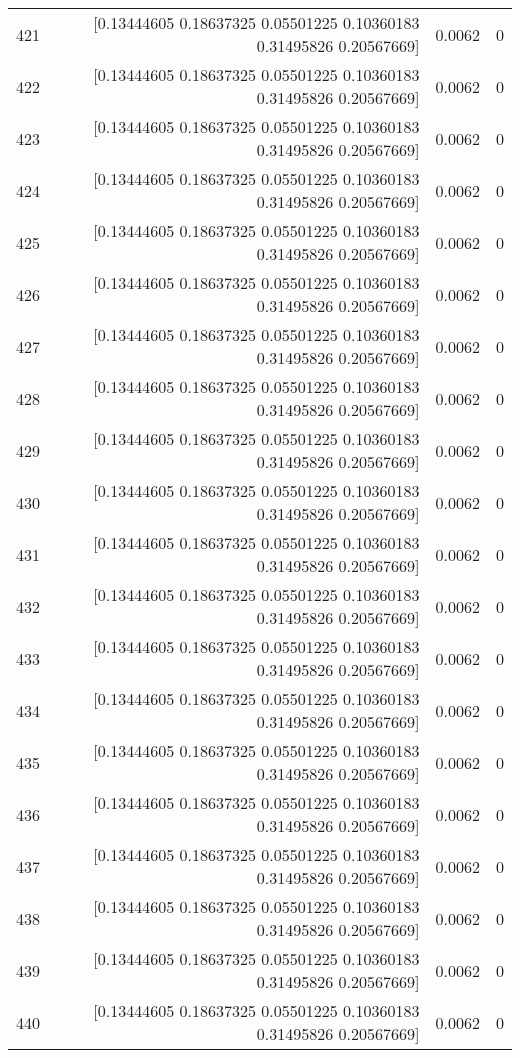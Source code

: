\begin{longtable}{lrrr}
421 & [0.13444605 0.18637325 0.05501225 0.10360183 0.31495826 0.20567669] & 0.0062 & 0 \\
422 & [0.13444605 0.18637325 0.05501225 0.10360183 0.31495826 0.20567669] & 0.0062 & 0 \\
423 & [0.13444605 0.18637325 0.05501225 0.10360183 0.31495826 0.20567669] & 0.0062 & 0 \\
424 & [0.13444605 0.18637325 0.05501225 0.10360183 0.31495826 0.20567669] & 0.0062 & 0 \\
425 & [0.13444605 0.18637325 0.05501225 0.10360183 0.31495826 0.20567669] & 0.0062 & 0 \\
426 & [0.13444605 0.18637325 0.05501225 0.10360183 0.31495826 0.20567669] & 0.0062 & 0 \\
427 & [0.13444605 0.18637325 0.05501225 0.10360183 0.31495826 0.20567669] & 0.0062 & 0 \\
428 & [0.13444605 0.18637325 0.05501225 0.10360183 0.31495826 0.20567669] & 0.0062 & 0 \\
429 & [0.13444605 0.18637325 0.05501225 0.10360183 0.31495826 0.20567669] & 0.0062 & 0 \\
430 & [0.13444605 0.18637325 0.05501225 0.10360183 0.31495826 0.20567669] & 0.0062 & 0 \\
431 & [0.13444605 0.18637325 0.05501225 0.10360183 0.31495826 0.20567669] & 0.0062 & 0 \\
432 & [0.13444605 0.18637325 0.05501225 0.10360183 0.31495826 0.20567669] & 0.0062 & 0 \\
433 & [0.13444605 0.18637325 0.05501225 0.10360183 0.31495826 0.20567669] & 0.0062 & 0 \\
434 & [0.13444605 0.18637325 0.05501225 0.10360183 0.31495826 0.20567669] & 0.0062 & 0 \\
435 & [0.13444605 0.18637325 0.05501225 0.10360183 0.31495826 0.20567669] & 0.0062 & 0 \\
436 & [0.13444605 0.18637325 0.05501225 0.10360183 0.31495826 0.20567669] & 0.0062 & 0 \\
437 & [0.13444605 0.18637325 0.05501225 0.10360183 0.31495826 0.20567669] & 0.0062 & 0 \\
438 & [0.13444605 0.18637325 0.05501225 0.10360183 0.31495826 0.20567669] & 0.0062 & 0 \\
439 & [0.13444605 0.18637325 0.05501225 0.10360183 0.31495826 0.20567669] & 0.0062 & 0 \\
440 & [0.13444605 0.18637325 0.05501225 0.10360183 0.31495826 0.20567669] & 0.0062 & 0 \\

\end{longtable}
